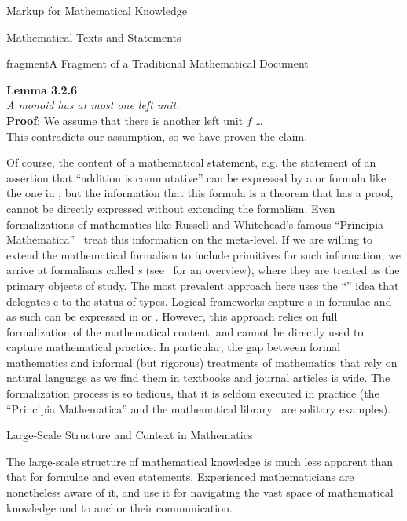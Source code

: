 \begin{omgroup}[id=math-markup]{Markup for Mathematical Knowledge}
\begin{omgroup}[id=meta-math]{Mathematical Texts and Statements}
\begin{myfig}{fragment}{A Fragment of a Traditional Mathematical Document}
{\begin{minipage}{10cm}
    {\bf Lemma 3.2.6}\\
    {\emph{A monoid has at most one left unit.}}\\
    {\bf Proof}: We assume that there is another left unit $f$ \ldots\\
    This contradicts our assumption, so we have proven the claim.\hfill\kasten
  \end{minipage}}
\end{myfig}
Of course, the content of a mathematical statement, e.g. the statement of an assertion
that ``addition is commutative'' can be expressed by a {\cmathml} or {\openmath} formula
like the one in {}, but the information that this formula is a theorem
that has a proof, cannot be directly expressed without extending the formalism. Even
formalizations of mathematics like Russell and Whitehead's famous ``Principia
Mathematica''~\cite{WhiRus:pm10} treat this information on the meta-level. If we are
willing to extend the mathematical formalism to include primitives for such information,
we arrive at formalisms called {\emph{s}} (see~\cite{Pfenning:lf01}
for an overview), where they are treated as the primary objects of study. The most
prevalent approach here uses the ``{}'' idea that delegates
{e} to the status of types. Logical frameworks capture
{s} in formulae and as such can be expressed in
{\cmathml} or {\openmath}.  However, this approach relies on full formalization of the
mathematical content, and cannot be directly used to capture mathematical practice. In
particular, the gap between formal mathematics and informal (but rigorous) treatments of
mathematics that rely on natural language as we find them in textbooks and journal
articles is wide.  The formalization process is so tedious, that it is seldom executed in
practice (the ``Principia Mathematica'' and the {\mizar} mathematical
library~\cite{MizarKB} are solitary examples).
\end{omgroup}

\begin{module}[id=math-context]
\begin{omgroup}[id=meta-theories]{Large-Scale Structure and Context in Mathematics}

  The large-scale structure of mathematical knowledge is much less apparent than that for
  formulae and even statements. Experienced mathematicians are nonetheless aware of it,
  and use it for navigating the vast space of mathematical knowledge and to anchor their
  communication. 


\end{omgroup}
\end{module}
\end{omgroup}
